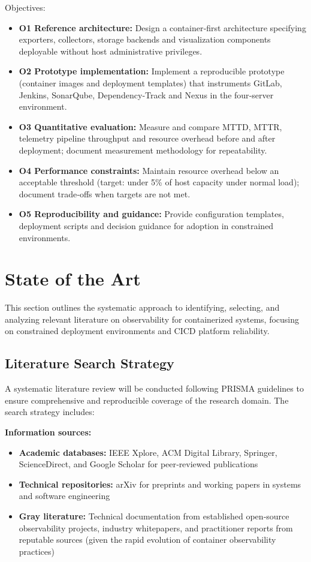 \documentclass[12pt]{article}
\begin{document}
Objectives:
\begin{itemize}
    \item \textbf{O1 Reference architecture:} Design a container‑first architecture specifying exporters, collectors, storage backends and visualization components deployable without host administrative privileges.
    \item \textbf{O2 Prototype implementation:} Implement a reproducible prototype (container images and deployment templates) that instruments GitLab, Jenkins, SonarQube, Dependency‑Track and Nexus in the four‑server environment.
    \item \textbf{O3 Quantitative evaluation:} Measure and compare \ac{MTTD}, \ac{MTTR}, telemetry pipeline throughput and resource overhead before and after deployment; document measurement methodology for repeatability.
    \item \textbf{O4 Performance constraints:} Maintain resource overhead below an acceptable threshold (target: under 5\% of host capacity under normal load); document trade‑offs when targets are not met.
    \item \textbf{O5 Reproducibility and guidance:} Provide configuration templates, deployment scripts and decision guidance for adoption in constrained environments.
\end{itemize}

\section{State of the Art}

This section outlines the systematic approach to identifying, selecting, and analyzing relevant literature on observability for containerized systems, focusing on constrained deployment environments and \ac{CICD} platform reliability.

\subsection{Literature Search Strategy}

A systematic literature review will be conducted following \ac{PRISMA} guidelines to ensure comprehensive and reproducible coverage of the research domain. The search strategy includes:

\textbf{Information sources:}
\begin{itemize}
    \item \textbf{Academic databases:} IEEE Xplore, ACM Digital Library, Springer, ScienceDirect, and Google Scholar for peer‑reviewed publications
    \item \textbf{Technical repositories:} arXiv for preprints and working papers in systems and software engineering
    \item \textbf{Gray literature:} Technical documentation from established open‑source observability projects, industry whitepapers, and practitioner reports from reputable sources (given the rapid evolution of container observability practices)
\end{itemize}
\end{document}
